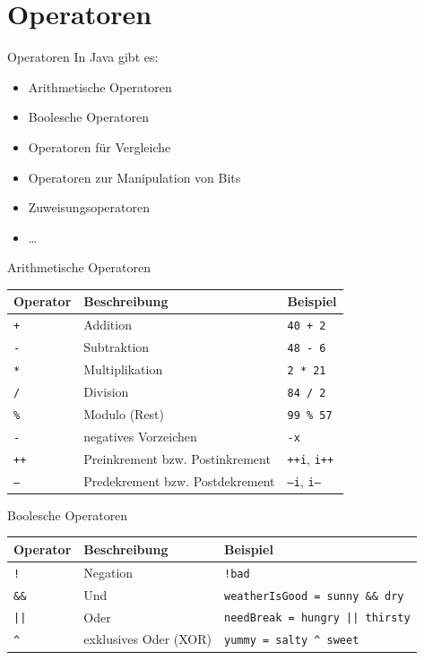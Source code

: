 \documentclass[18pt]{beamer}
\begin{document}
\section{Operatoren}

\begin{frame}{Operatoren}
    In Java gibt es:
    \begin{itemize}
        \item Arithmetische Operatoren
        \item Boolesche Operatoren
        \item Operatoren für Vergleiche
        \item Operatoren zur Manipulation von Bits
        \item Zuweisungsoperatoren
        \item \dots
    \end{itemize}
\end{frame}

\begin{frame}{Arithmetische Operatoren}
    \center
    \begin{tabular}{l | l | l}
        \textbf{Operator} & \textbf{Beschreibung} & \textbf{Beispiel} \\
        \hline
        \texttt{+} & Addition & \texttt{40 + 2} \\
        \texttt{-} & Subtraktion & \texttt{48 - 6} \\
        \texttt{*} & Multiplikation & \texttt{2 * 21} \\
        \texttt{/} & Division & \texttt{84 / 2} \\
        \texttt{\%} & Modulo (Rest) & \texttt{99 \% 57} \\
        \hline
        \texttt{-} & negatives Vorzeichen & \texttt{-x} \\
        \texttt{++} & Preinkrement bzw. Postinkrement & \texttt{++i}, \texttt{i++} \\
        \texttt{--} & Predekrement bzw. Postdekrement & \texttt{--i}, \texttt{i--} \\
    \end{tabular}
\end{frame}

\begin{frame}{Boolesche Operatoren}
    \center
    \begin{tabular}{l | l | l}
        \textbf{Operator} & \textbf{Beschreibung} & \textbf{Beispiel} \\
        \hline
        \texttt{!} & Negation & \texttt{!bad} \\
        \texttt{\&\&} & Und & \texttt{weatherIsGood = sunny \&\& dry} \\
        \texttt{||} & Oder & \texttt{needBreak = hungry || thirsty} \\
        \texttt{\textasciicircum} & exklusives Oder (XOR) & \texttt{yummy = salty \textasciicircum ~sweet} \\
    \end{tabular}
\end{frame}
\end{document}
